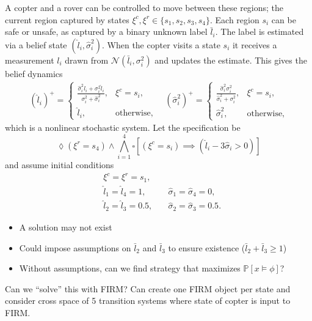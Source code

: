 \documentclass[conference]{IEEEtran}
\begin{document}
A copter and a rover can be controlled to move between these regions; the current region captured by states $\xi^c, \xi^r \in \{ s_1, s_2, s_3, s_4 \}$. Each region $s_i$ can be safe or unsafe, as captured by a binary unknown label $\bar l_i$. The label is estimated via a belief state $(\hat l_i, \hat \sigma^2_i)$. When the copter visits a state $s_i$ it receives a measurement $l_i$ drawn from $\mathcal N(\bar l_i, \sigma_i^2)$ and updates the estimate. This gives the belief dynamics
\begin{equation}
\begin{aligned}
(\hat l_i)^+ =
\begin{cases}
  \frac{\hat \sigma^2_i l_i + \sigma_i^2 \hat l_i}{\sigma_i^2 + \hat \sigma_i^2}, & \xi^c = s_i, \\
  \hat l_i, & \text{otherwise,}
\end{cases}
\quad (\hat \sigma_i^2)^+ = 
\begin{cases}
  \frac{\hat \sigma_i^2 \sigma_i^2}{\hat \sigma_i^2 + \sigma_i^2}, & \xi^c = s_i, \\
  \hat \sigma_i^2, & \text{otherwise,}
\end{cases}
\end{aligned}
\end{equation}
which is a nonlinear stochastic system. Let the specification be
\begin{equation}
  \lozenge (\xi^r = s_4) \land \bigwedge_{i=1}^4 \square \left[ (\xi^c = s_i) \implies (\hat l_i -3 \hat\sigma_i > 0) \right]
\end{equation}
and assume initial conditions
\begin{equation}
\begin{aligned}
  & \xi^c = \xi^r = s_1, & \\
  & \hat l_1 = \hat l_4 = 1, \quad   & \hat \sigma_1 = \hat \sigma_4 = 0, \\
  & \hat l_2 = \hat l_3 = 0.5, \quad & \hat \sigma_2 = \hat \sigma_3 = 0.5.
\end{aligned}
\end{equation}

\begin{itemize}
  \item A solution may not exist \\
  \item Could impose assumptions on $\bar l_2$ and $\bar l_3$ to ensure existence ($\bar l_2 + \bar l_3 \geq 1$) \\
  \item Without assumptions, can we find strategy that maximizes $\mathbb{P} \left[ x \models \phi \right]$?
\end{itemize}
Can we ``solve'' this with FIRM? Can create one FIRM object per state and consider cross space of 5 transition systems where state of copter is input to FIRM.
\end{document}
